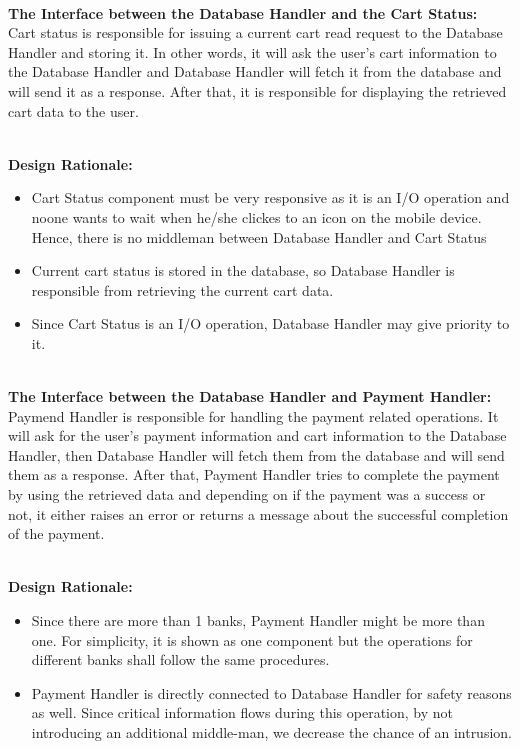 \documentclass[11pt]{article}
\begin{document}
    \textbf{\\The Interface between the Database Handler and the Cart Status:\\}
    Cart status is responsible for issuing a current cart read request to the Database Handler and storing it. In other words, it will ask the user's cart information to the Database Handler and 
    Database Handler will fetch it from the database and will send it as a response. After that, it is responsible for displaying the retrieved cart data to the user. 
    
    \textbf{\\Design Rationale:}
    \begin{itemize}
       \item Cart Status component must be very responsive as it is an I/O operation and noone wants to wait when he/she clickes to an icon on the mobile device. 
       Hence, there is no middleman between Database Handler and Cart Status
       \item Current cart status is stored in the database, so Database Handler is responsible from retrieving the current cart data. 
       \item Since Cart Status is an I/O operation, Database Handler may give priority to it.
    \end{itemize}
    
    \textbf{\\The Interface between the Database Handler and Payment Handler:\\}
    Paymend Handler is responsible for handling the payment related operations. It will ask for the user's payment information and cart information to the Database Handler,
    then Database Handler will fetch them from the database and will send them as a response. 
    After that, Payment Handler tries to complete the payment by using the retrieved data and depending on if the payment was a success or not, it either raises an error or 
    returns a message about the successful completion of the payment.
    
    \textbf{\\Design Rationale:}
    \begin{itemize}
       \item Since there are more than 1 banks, Payment Handler might be more than one. For simplicity, it is shown as one component but the operations for different banks 
       shall follow the same procedures. 
       \item Payment Handler is directly connected to Database Handler for safety reasons as well. Since critical information flows during this operation, 
       by not introducing an additional middle-man, we decrease the chance of an intrusion. 
    \end{itemize}
\end{document}
